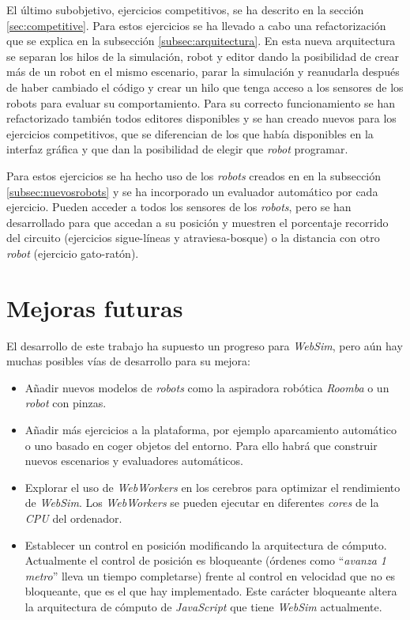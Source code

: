 El último subobjetivo, ejercicios competitivos, se ha descrito en la sección \ref{sec:competitive}. Para estos ejercicios se ha llevado a cabo una refactorización que se explica en la subsección \ref{subsec:arquitectura}. En esta nueva arquitectura se separan los hilos de la simulación, robot y editor dando la posibilidad de crear más de un robot en el mismo escenario, parar la simulación y reanudarla después de haber cambiado el código y crear un hilo que tenga acceso a los sensores de los robots para evaluar su comportamiento. Para su correcto funcionamiento se han refactorizado también todos editores disponibles y se han creado nuevos para los ejercicios competitivos, que se diferencian de los que había disponibles en la interfaz gráfica y que dan la posibilidad de elegir que \textit{robot} programar.

Para estos ejercicios se ha hecho uso de los \textit{robots} creados en en la subsección \ref{subsec:nuevosrobots} y se ha incorporado un evaluador automático por cada ejercicio. Pueden acceder a todos los sensores de los \textit{robots}, pero se han desarrollado para que accedan a su posición y muestren el porcentaje recorrido del circuito (ejercicios sigue-líneas y atraviesa-bosque) o la distancia con otro \textit{robot} (ejercicio gato-ratón). \\

\section{Mejoras futuras}
\label{sec:mejoras_futuras}

El desarrollo de este trabajo ha supuesto un progreso para \textit{WebSim}, pero aún hay muchas posibles vías de desarrollo para su mejora:

\begin{itemize}
    \item Añadir nuevos modelos de \textit{robots} como la aspiradora robótica \textit{Roomba} o un \textit{robot} con pinzas. 
    \item Añadir más ejercicios a la plataforma, por ejemplo aparcamiento automático o uno basado en coger objetos del entorno. Para ello habrá que construir nuevos escenarios y evaluadores automáticos. 
    \item Explorar el uso de \textit{WebWorkers} en los cerebros para optimizar el rendimiento de \textit{WebSim}. Los \textit{WebWorkers} se pueden ejecutar en diferentes \textit{cores} de la \textit{CPU} del ordenador.
    \item Establecer un control en posición modificando la arquitectura de cómputo. Actualmente el control de posición es bloqueante (órdenes como ``\textit{avanza 1 metro}'' lleva un tiempo completarse) frente al control en velocidad que no es bloqueante, que es el que hay implementado. Este carácter bloqueante altera la arquitectura de cómputo de \textit{JavaScript} que tiene \textit{WebSim} actualmente.
\end{itemize}